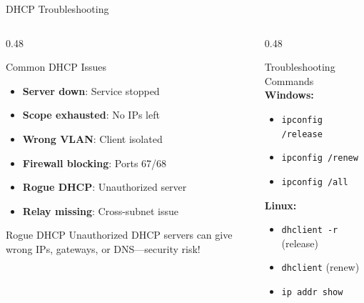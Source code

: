 \documentclass[aspectratio=169]{beamer}  %
\begin{document}
\begin{frame}{DHCP Troubleshooting}
    \begin{columns}[T]
        \begin{column}{0.48\textwidth}
            \begin{block}{Common DHCP Issues}
                \small
                \begin{itemize}\setlength{\itemsep}{2pt}
                    \item \textbf{Server down}: Service stopped
                    \item \textbf{Scope exhausted}: No IPs left
                    \item \textbf{Wrong VLAN}: Client isolated
                    \item \textbf{Firewall blocking}: Ports 67/68
                    \item \textbf{Rogue DHCP}: Unauthorized server
                    \item \textbf{Relay missing}: Cross-subnet issue
                \end{itemize}
            \end{block}
            
            \vspace{0.2em}
            \begin{alertblock}{Rogue DHCP}
                \small
                Unauthorized DHCP servers can give wrong IPs, gateways, or DNS---security risk!
            \end{alertblock}
        \end{column}
        \begin{column}{0.48\textwidth}
            \begin{block}{Troubleshooting Commands}
                \scriptsize
                \textbf{Windows:}
                \begin{itemize}\setlength{\itemsep}{1pt}
                    \item \texttt{ipconfig /release}
                    \item \texttt{ipconfig /renew}
                    \item \texttt{ipconfig /all}
                \end{itemize}
                
                \vspace{0.2em}
                \scriptsize
                \textbf{Linux:}
                \begin{itemize}\setlength{\itemsep}{1pt}
                    \item \texttt{dhclient -r} (release)
                    \item \texttt{dhclient} (renew)
                    \item \texttt{ip addr show}
                \end{itemize}
            \end{block}
            

\end{column}
\end{columns}
\end{frame}
\end{document}
